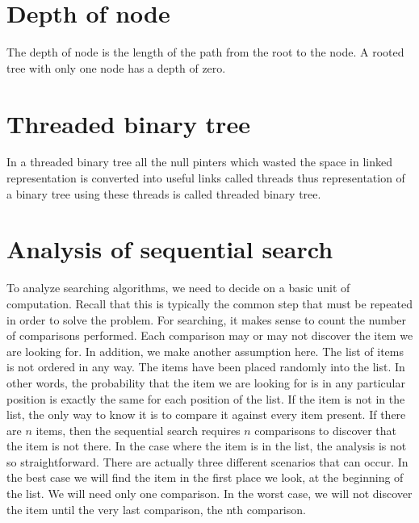 \documentclass{article}
\begin{document}
\section{Depth of node}
The depth of node is the length of the path from the
root to the node. A rooted tree with only one node has
a depth of zero.
\section{Threaded binary tree }

In a threaded binary tree all the null pinters which
wasted the space in linked representation is converted
into useful links called threads thus representation of a
binary tree using these threads is called threaded
binary tree. 
\section{Analysis of sequential search}
To analyze searching algorithms, we need to decide
on a basic unit of computation. Recall that this is
typically the common step that must be repeated in
order to solve the problem. For searching, it makes
sense to count the number of comparisons performed.
Each comparison may or may not discover the item
we are looking for. In addition, we make another
assumption here. The list of items is not ordered in
any way. The items have been placed randomly into
the list. In other words, the probability that the item
we are looking for is in any particular position is
exactly the same for each position of the list.
If the item is not in the list, the only way to know it is
to compare it against every item present. If there are
\(n\) items, then the sequential search requires \(n\)
comparisons to discover that the item is not there. In
the case where the item is in the list, the analysis is
not so straightforward. There are actually three
different scenarios that can occur. In the best case we
will find the item in the first place we look, at the
beginning of the list. We will need only one
comparison. In the worst case, we will not discover
the item until the very last comparison, the nth
comparison.
\end{document}
